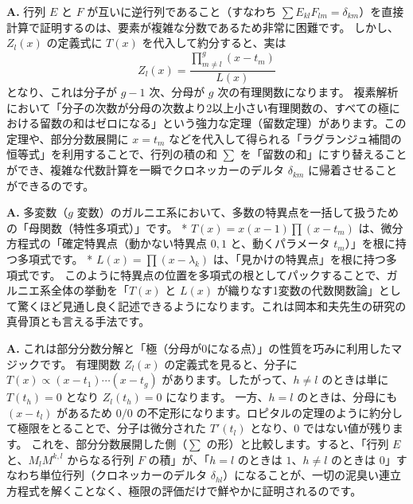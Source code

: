\begin{Q}
\textbf{A.} 行列 $E$ と $F$ が互いに逆行列であること（すなわち $\sum E_{kl}F_{lm} = \delta_{km}$）を直接計算で証明するのは、要素が複雑な分数であるため非常に困難です。
しかし、$Z_l(x)$ の定義式に $T(x)$ を代入して約分すると、実は
$$ Z_l(x) = \frac{\prod_{m \neq l}^g (x-t_m)}{L(x)} $$
となり、これは分子が $g-1$ 次、分母が $g$ 次の有理関数になります。
複素解析において「分子の次数が分母の次数より2以上小さい有理関数の、すべての極における留数の和はゼロになる」という強力な定理（留数定理）があります。この定理や、部分分数展開に $x=t_m$ などを代入して得られる「ラグランジュ補間の恒等式」を利用することで、行列の積の和 $\sum$ を「留数の和」にすり替えることができ、複雑な代数計算を一瞬でクロネッカーのデルタ $\delta_{km}$ に帰着させることができるのです。
\end{Q}

\begin{Q}
\textbf{A.} 多変数（$g$ 変数）のガルニエ系において、多数の特異点を一括して扱うための「母関数（特性多項式）」です。
* $T(x) = x(x-1)\prod (x-t_m)$ は、微分方程式の「確定特異点（動かない特異点 $0, 1$ と、動くパラメータ $t_m$）」を根に持つ多項式です。
* $L(x) = \prod (x-\lambda_k)$ は、「見かけの特異点」を根に持つ多項式です。
このように特異点の位置を多項式の根としてパックすることで、ガルニエ系全体の挙動を「$T(x)$ と $L(x)$ が織りなす1変数の代数関数論」として驚くほど見通し良く記述できるようになります。これは岡本和夫先生の研究の真骨頂とも言える手法です。
\end{Q}

\begin{Q}[【核心】$Z_l(t_h)$ に $x=t_h$ を代入するだけで、なぜ逆行列の証明が終わるのか？]
\textbf{A.} これは部分分数分解と「極（分母が0になる点）」の性質を巧みに利用したマジックです。
有理関数 $Z_l(x)$ の定義式を見ると、分子に $T(x) \propto (x-t_1)\cdots(x-t_g)$ があります。したがって、$h \neq l$ のときは単に $T(t_h) = 0$ となり $Z_l(t_h) = 0$ になります。
一方、$h = l$ のときは、分母にも $(x-t_l)$ があるため $0/0$ の不定形になります。ロピタルの定理のように約分して極限をとることで、分子は微分された $T'(t_l)$ となり、$0$ ではない値が残ります。
これを、部分分数展開した側（$\sum$ の形）と比較します。すると、「行列 $E$ と、$M_l M^{k,l}$ からなる行列 $F$ の積」が、「$h=l$ のときは $1$、$h \neq l$ のときは $0$」すなわち単位行列（クロネッカーのデルタ $\delta_{hl}$）になることが、一切の泥臭い連立方程式を解くことなく、極限の評価だけで鮮やかに証明されるのです。
\end{Q}

